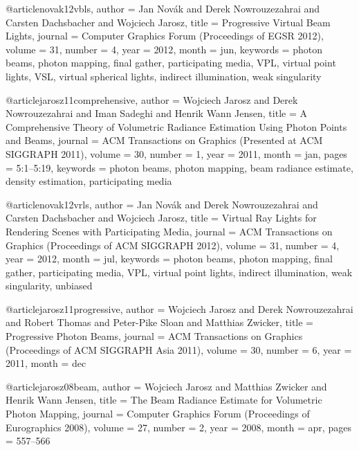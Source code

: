\begin{thebibliography}{xx}

@article{novak12vbls,
    author = {Jan Nov{\'a}k and Derek Nowrouzezahrai and Carsten Dachsbacher and Wojciech Jarosz},
    title = {Progressive Virtual Beam Lights},
    journal = {Computer Graphics Forum (Proceedings of EGSR 2012)},
    volume = {31},
    number = {4},
    year = {2012},
    month = jun,
    keywords = {photon beams, photon mapping, final gather, participating media, VPL, virtual point lights, VSL, virtual spherical lights, indirect illumination, weak singularity}
}

@article{jarosz11comprehensive,
    author = {Wojciech Jarosz and Derek Nowrouzezahrai and Iman Sadeghi and Henrik Wann Jensen},
    title = {A Comprehensive Theory of Volumetric Radiance Estimation Using Photon Points and Beams},
    journal = {ACM Transactions on Graphics (Presented at ACM SIGGRAPH 2011)},
    volume = {30},
    number = {1},
    year = {2011},
    month = jan,
    pages = {5:1--5:19},
    keywords = {photon beams, photon mapping, beam radiance estimate, density estimation, participating media}
}

@article{novak12vrls,
    author = {Jan Nov{\'a}k and Derek Nowrouzezahrai and Carsten Dachsbacher and Wojciech Jarosz},
    title = {Virtual Ray Lights for Rendering Scenes with Participating Media},
    journal = {ACM Transactions on Graphics (Proceedings of ACM SIGGRAPH 2012)},
    volume = {31},
    number = {4},
    year = {2012},
    month = jul,
    keywords = {photon beams, photon mapping, final gather, participating media, VPL, virtual point lights, indirect illumination, weak singularity, unbiased}
}

@article{jarosz11progressive,
    author = {Wojciech Jarosz and Derek Nowrouzezahrai and Robert Thomas and Peter-Pike Sloan and Matthias Zwicker},
    title = {Progressive Photon Beams},
    journal = {ACM Transactions on Graphics (Proceedings of ACM SIGGRAPH Asia 2011)},
    volume = {30},
    number = {6},
    year = {2011},
    month = dec
}

@article{jarosz08beam,
    author = {Wojciech Jarosz and Matthias Zwicker and Henrik Wann Jensen},
    title = {The Beam Radiance Estimate for Volumetric Photon Mapping},
    journal = {Computer Graphics Forum (Proceedings of Eurographics 2008)},
    volume = {27},
    number = {2},
    year = {2008},
    month = apr,
    pages = {557--566}
}










\end{thebibliography}


